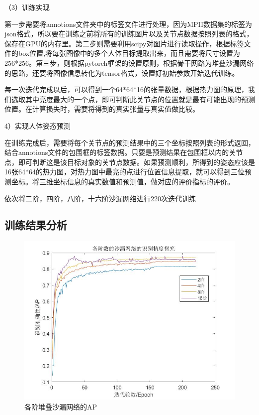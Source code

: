 （3）训练实现

第一步需要将annotions文件夹中的标签文件进行处理，因为MPII数据集的标签为json格式，所以要在训练之前将所有的训练图片以及关节点数据按照列表的格式，保存在GPU的内存里。第二步则需要利用scipy对图片进行读取操作，根据标签文件的box位置,将每张图像中的多个人体目标提取出来，而且需要将尺寸设置为256*256。第三步，则根据pytorch框架的设置原则，根据骨干网路为堆叠沙漏网络的思路，还要将图像信息转化为tensor格式，设置好初始参数开始迭代训练。

每一次迭代完成以后，可以得到一个64*64*16的张量数据，根据热力图的原理，我们选取其中亮度最大的一个点，即可判断此关节点的位置就是最有可能出现的预测位置。在计算损失时，需要将得到的真实张量与真实值做比较。

4）实现人体姿态预测

在训练完成后，需要将每个关节点的预测结果中的三个坐标按照列表的形式返回，结合annotions文件的包围框的标签数据。只要是预测结果在包围框以内的关节点，即可判断这是该目标对象的关节点数据。如果预测顺利，所得到的姿态应该是16张64*64的热力图，对热力图中最亮的点进行位置信息提取，就可以得到三位预测坐标。将三维坐标信息的真实数值和预测值，做对应的评价指标的评价。
	
依次将二阶，四阶，八阶，十六阶沙漏网络进行220次迭代训练

\subsection{训练结果分析}

\begin{figure}[h]
	\includegraphics[width=\textwidth]{pic/stacked_hourglass.jpg}
	\caption{各阶堆叠沙漏网络的AP}
	\label{AP_graph}
\end{figure}

